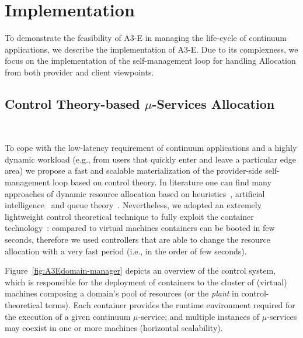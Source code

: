 \section{Implementation}\label{sec:implementation}


To demonstrate the feasibility of A3-E in managing the life-cycle of continuum applications, we describe the implementation of A3-E. Due to its complexness, we focus on the implementation of the self-management loop for handling Allocation from both provider and client viewpoints. 

\subsection{Control Theory-based $\mu$-Services Allocation}~\label{sec:ps_allocation}

To cope with the low-latency requirement of continuum applications and a highly dynamic workload  (e.g., from users that quickly enter and leave a particular edge area) we 
propose a fast and scalable materialization of the provider-side self-management loop based on control theory. In literature one can find many approaches of dynamic resource allocation based on heuristics~\cite{dustdar0}, artificial intelligence~\cite{ia1} and queue theory~\cite{queue1}. Nevertheless, we adopted an extremely lightweight control theoretical technique to fully exploit the container technology~\cite{Quatrocchi2016discrete}: compared to virtual machines containers can be booted in few seconds, therefore we used controllers that are able to change the resource allocation with a very fast period (i.e., in the order of few seconds).

Figure~\ref{fig:A3Edomain-manager} depicts an overview of the control system, which is responsible for the deployment of containers to the cluster of (virtual) machines composing a domain's pool of resources (or the \textit{plant} in control-theoretical terms). Each container provides the runtime environment required for the execution of a given continuum $\mu$-service; and multiple instances of $\mu$-services may coexist in one or more machines (horizontal scalability).

